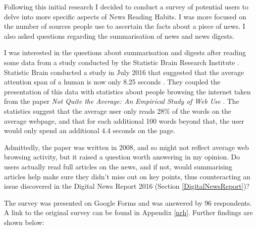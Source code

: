 \documentclass[12pt]{article}
\begin{document}
\label{survey}

Following this initial research I decided to conduct a survey of potential users to delve into more specific aspects of News Reading Habits. I was more focused on the number of sources people use to ascertain the facts about a piece of news. I also asked questions regarding the summarisation of news and news digests.

I was interested in the questions about summarisation and digests after reading some data from a study conducted by the Statistic Brain Research Institute \cite{statisticBrain}. Statistic Brain conducted a study in July 2016 that suggested that the average attention span of a human is now only 8.25 seconds \cite{attentionSpan}. They coupled the presentation of this data with statistics about people browsing the internet taken from the paper \emph{Not Quite the Average:
An Empirical Study of Web Use} \cite{empiricalStudyofWebUse}. The statistics suggest that the average user only reads 28\% of the words on the average webpage, and that for each additional 100 words beyond that, the user would only spend an additional 4.4 seconds on the page.

Admittedly, the paper was written in 2008, and so might not reflect average web browsing activity, but it raised a question worth answering in my opinion. Do users actually read full articles on the news, and if not, would summarising articles help make sure they didn't miss out on key points, thus counteracting an issue discovered in the Digital News Report 2016 \cite{digitalNewsReport} (Section \ref{DigitalNewsReport})? 

The survey was presented on Google Forms \cite{googleForms} and was answered by 96 respondents. A link to the original survey can be found in Appendix \ref{nrh}. Further findings are shown below:
\end{document}

